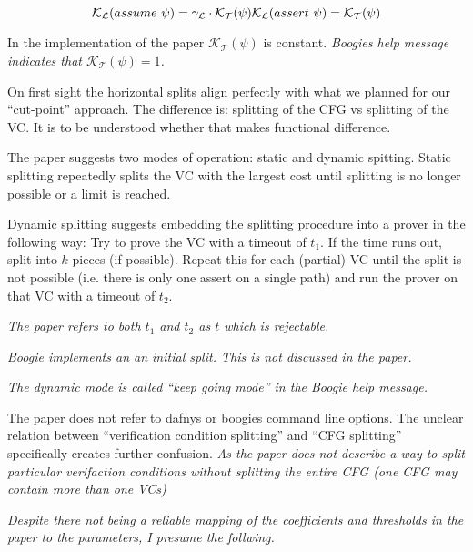 \documentclass{scrartcl}
\begin{document}
\[
    \mathcal{K}_\mathcal{L}(assume\ \psi) =
    \gamma_\mathcal{L} \cdot \mathcal{K}_\mathcal{T}(\psi)\\
    \mathcal{K}_\mathcal{L}(assert\ \psi) = \mathcal{K}_\mathcal{T}(\psi)
\]

In the implementation of the paper \(\mathcal{K}_\mathcal{T}(\psi)\) is constant.
\textit{Boogies help message indicates that \(\mathcal{K}_\mathcal{T}(\psi) = 1\).}


On first sight the horizontal splits align perfectly with what we planned for our
\enquote{cut-point} approach.
The difference is: splitting of the CFG vs splitting of the VC.
It is to be understood whether that makes functional difference.


The paper suggests two modes of operation: static and dynamic spitting.
Static splitting repeatedly splits the VC with the largest cost
until splitting is no longer possible or a limit is reached.

Dynamic splitting suggests embedding the splitting procedure into a prover in the following way:
Try to prove the VC with a timeout of \(t_1\).
If the time runs out, split into \(k\) pieces (if possible).
Repeat this for each (partial) VC until the split is not possible
(i.e. there is only one assert on a single path)
and run the prover on that VC with a timeout of \(t_2\).

\textit{The paper refers to both \(t_1\) and \(t_2\) as \(t\) which is rejectable.}

\textit{Boogie implements an an initial split. This is not discussed in the paper.}

\textit{The dynamic mode is called \enquote{keep going mode} in the Boogie help message.}
    

The paper does not refer to dafnys or boogies command line options.
The unclear relation between \enquote{verification condition splitting}
and \enquote{CFG splitting} specifically creates further confusion.
\textit{As the paper does not describe a way to split particular verifaction conditions
without splitting the entire CFG (one CFG may contain more than one VCs)}

\textit{Despite there not being a reliable mapping of the coefficients and thresholds in the paper
to the parameters,
I presume the follwing.}
\end{document}
